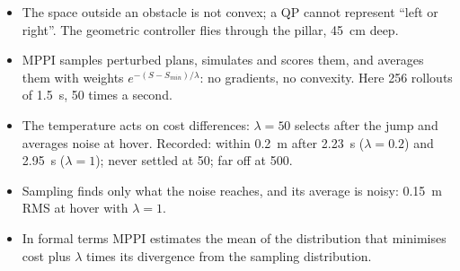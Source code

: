 \begin{remember}
\begin{itemize}
  \item The space outside an obstacle is not convex; a QP cannot represent \enquote{left or right}. The geometric controller flies through the pillar, \SI{45}{cm} deep.
  \item MPPI samples perturbed plans, simulates and scores them, and averages them with weights $e^{-(S - S_{min})/\lambda}$: no gradients, no convexity. Here 256 rollouts of \SI{1.5}{s}, 50 times a second.
  \item The temperature acts on cost differences: $\lambda = 50$ selects after the jump and averages noise at hover. Recorded: within \SI{0.2}{m} after \SI{2.23}{s} ($\lambda = 0.2$) and \SI{2.95}{s} ($\lambda = 1$); never settled at 50; far off at 500.
  \item Sampling finds only what the noise reaches, and its average is noisy: \SI{0.15}{m} RMS at hover with $\lambda = 1$.
  \item In formal terms MPPI estimates the mean of the distribution that minimises cost plus $\lambda$ times its divergence from the sampling distribution.
\end{itemize}
\end{remember}

